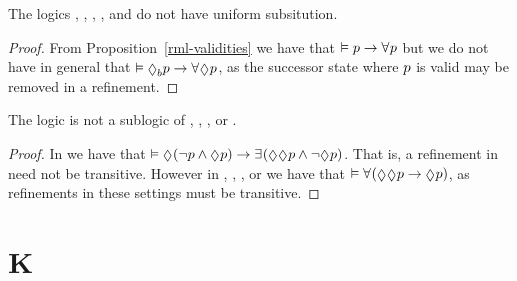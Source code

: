 \begin{proposition}
The logics \logicRmlK{}, \logicRmlKF{}, \logicRmlKFF{}, \logicRmlKD{}, \logicRmlSF{} and \logicRmlS{} do not have uniform subsitution.
\end{proposition}

\begin{proof}
From Proposition~\ref{rml-validities} we have that $\entails \atomP \implies \allrefs \atomP$ but we do not have in general that $\entails \possibleB \atomP \implies \allrefs \possible \atomP$, as the successor state where $p$ is valid may be removed in a refinement.
\end{proof}

\begin{proposition}
The logic \logicRmlK{} is not a sublogic of \logicRmlKF{}, \logicRmlKFF{}, \logicRmlKD{}, \logicRmlSF{} or \logicRmlS{}.
\end{proposition}

\begin{proof}
In \logicRmlK{} we have that $\entails \possible (\lnot \atomP \land \possible \atomP) \implies \somerefs (\possible \possible \atomP \land \lnot \possible \atomP)$. 
That is, a refinement in \logicRmlK{} need not be transitive.
However in \logicRmlKF{}, \logicRmlKFF{}, \logicRmlKD{}, \logicRmlSF{} or \logicRmlS{} we have that $\entails \allrefs (\possible \possible \atomP \implies \possible \atomP)$, as refinements in these settings must be transitive.
\end{proof}

\section{K}

